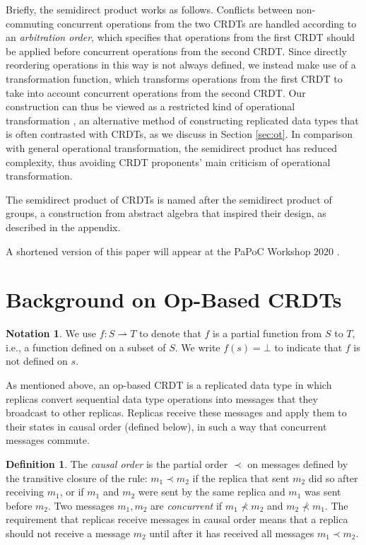 \documentclass[acmsmall,nonacm]{acmart}
\newcommand{\pra}{\rightharpoonup}
\theoremstyle{plain}
\theoremstyle{definition}
\newtheorem{mydef}[mythm]{Definition}
\newtheorem*{mynot}{Notation}
\begin{document}
Briefly, the semidirect product works as follows.  Conflicts between non-commuting concurrent operations from the two CRDTs are handled according to an \textit{arbitration order}, which specifies that operations from the first CRDT should be applied before concurrent operations from the second CRDT.  Since directly reordering operations in this way is not always defined, we instead make use of a transformation function, which transforms operations from the first CRDT to take into account concurrent operations from the second CRDT.  Our construction can thus be viewed as a restricted kind of operational transformation \cite{ot_ressel}, an alternative method of constructing replicated data types that is often contrasted with CRDTs, as we discuss in Section \ref{sec:ot}.  In comparison with general operational transformation, the semidirect product has reduced complexity, thus avoiding CRDT proponents' main criticism of operational transformation.


The semidirect product of CRDTs is named after the semidirect product of groups, a construction from abstract algebra that inspired their design, as described in the appendix.

A shortened version of this paper will appear at the PaPoC Workshop 2020 \cite{papoc}.


\section{Background on Op-Based CRDTs}
\label{sec:background}
\begin{mynot}
We use $f: S \pra T$ to denote that $f$ is a partial function from $S$ to $T$, i.e., a function defined on a subset of $S$.  We write $f(s) = \bot$ to indicate that $f$ is not defined on $s$.
\end{mynot}

As mentioned above, an op-based CRDT is a replicated data type in which replicas convert sequential data type operations into messages that they broadcast to other replicas.  Replicas receive these messages and apply them to their states in causal order (defined below), in such a way that concurrent messages commute.
\begin{mydef}
The \textit{causal order} is the partial order $\prec$ on messages defined by the transitive closure of the rule: $m_1 \prec m_2$ if the replica that sent $m_2$ did so after receiving $m_1$, or if $m_1$ and $m_2$ were sent by the same replica and $m_1$ was sent before $m_2$.  Two messages $m_1, m_2$ are \textit{concurrent} if $m_1 \nprec m_2$ and $m_2 \nprec m_1$.  The requirement that replicas receive messages in causal order means that a replica should not receive a message $m_2$ until after it has received all messages $m_1 \prec m_2$.
\end{mydef}
\end{document}
